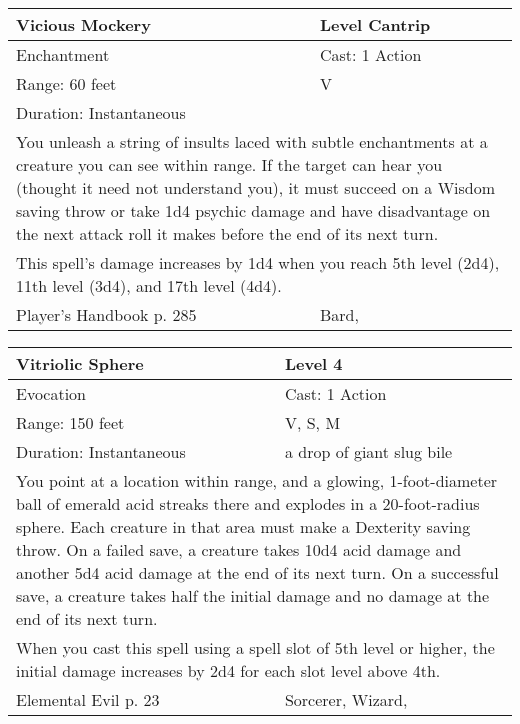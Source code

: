 \documentclass[11pt]{report}
\begin{document}
\begin{table}[H]
	\begin{tabular}{||p{6cm}|p{6cm}||}
		\hline\hline
		\bf{Vicious Mockery} & Level Cantrip\\ \hline
		Enchantment & Cast: 1 Action\\ \hline
		Range: 60 feet & V\\ \hline
		Duration: Instantaneous & \\ \hline
		\multicolumn{2}{||p{12cm}||}{You unleash a string of insults laced with subtle enchantments at a creature you can see within range.
If the target can hear you (thought it need not understand you), it must succeed on a Wisdom saving throw or take 1d4 psychic damage and have disadvantage on the next attack roll it makes before the end of its next turn.}\\ \hline
		\multicolumn{2}{||p{12cm}||}{This spell’s damage increases by 1d4 when you reach 5th level (2d4), 11th level (3d4), and 17th level (4d4).}\\ \hline
Player's Handbook p. 285 & Bard, \\ \hline\hline
	\end{tabular}
\end{table}

\begin{table}[H]
	\begin{tabular}{||p{6cm}|p{6cm}||}
		\hline\hline
		\bf{Vitriolic Sphere} & Level 4\\ \hline
		Evocation & Cast: 1 Action\\ \hline
		Range: 150 feet & V, S, M\\ \hline
		Duration: Instantaneous & a drop of giant slug bile\\ \hline
		\multicolumn{2}{||p{12cm}||}{You point at a location within range, and a glowing, 1-foot-diameter ball of emerald acid streaks there and explodes in a 20-foot-radius sphere. Each creature in that area must make a Dexterity saving throw. On a failed save, a creature takes 10d4 acid damage and another 5d4 acid damage at the end of its next turn. On a successful save, a creature takes half the initial damage and no damage at the end of its next turn.}\\ \hline
		\multicolumn{2}{||p{12cm}||}{When you cast this spell using a spell slot of 5th level or higher, the initial damage increases by 2d4 for each slot level above 4th.}\\ \hline
Elemental Evil p. 23 & Sorcerer, Wizard, \\ \hline\hline
	\end{tabular}
\end{table}
\end{document}
